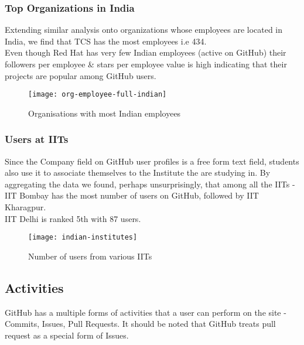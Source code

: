 \newpage

\subsubsection{Top Organizations in India}

Extending similar analysis onto organizations whose employees are located in India, we find that
TCS has the most employees i.e 434. \\

Even though Red Hat has very few Indian employees (active on GitHub) their followers per employee \&
stars per employee value is high indicating that their projects are popular among GitHub users.

\vspace{40px}
\begin{figure}[htb]
\centering
\centerline{\texttt{[image: org-employee-full-indian]}}
\caption{Organisations with most Indian employees}
\end{figure}

\newpage
\subsubsection{Users at IITs}

Since the Company field on GitHub user profiles is a free form text field, students also use it
to associate themselves to the Institute the are studying in. By aggregating the data we found,
perhaps unsurprisingly, that among all the IITs - IIT Bombay has the most number of users on
GitHub, followed by IIT Kharagpur. \\

IIT Delhi is ranked 5th with 87 users.

\vspace{40px}
\begin{figure}[htb]
\centering
\texttt{[image: indian-institutes]}
\caption{Number of users from various IITs}
\end{figure}

\newpage
\subsection{Activities}

GitHub has a multiple forms of activities that a user can perform on the site - Commits, Issues, Pull Requests.
It should be noted that GitHub treats pull request as a special form of Issues. \\

